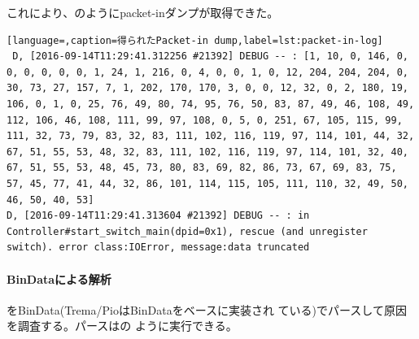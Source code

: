 これにより、のようにpacket-inダンプが取得できた。
\begin{lstlisting}[language=,caption=得られたPacket-in dump,label=lst:packet-in-log]
 D, [2016-09-14T11:29:41.312256 #21392] DEBUG -- : [1, 10, 0, 146, 0, 0, 0, 0, 0, 0, 1, 24, 1, 216, 0, 4, 0, 0, 1, 0, 12, 204, 204, 204, 0, 30, 73, 27, 157, 7, 1, 202, 170, 170, 3, 0, 0, 12, 32, 0, 2, 180, 19, 106, 0, 1, 0, 25, 76, 49, 80, 74, 95, 76, 50, 83, 87, 49, 46, 108, 49, 112, 106, 46, 108, 111, 99, 97, 108, 0, 5, 0, 251, 67, 105, 115, 99, 111, 32, 73, 79, 83, 32, 83, 111, 102, 116, 119, 97, 114, 101, 44, 32, 67, 51, 55, 53, 48, 32, 83, 111, 102, 116, 119, 97, 114, 101, 32, 40, 67, 51, 55, 53, 48, 45, 73, 80, 83, 69, 82, 86, 73, 67, 69, 83, 75, 57, 45, 77, 41, 44, 32, 86, 101, 114, 115, 105, 111, 110, 32, 49, 50, 46, 50, 40, 53]
D, [2016-09-14T11:29:41.313604 #21392] DEBUG -- : in Controller#start_switch_main(dpid=0x1), rescue (and unregister switch). error class:IOError, message:data truncated
\end{lstlisting}

    \paragraph{BinDataによる解析}
をBinData(Trema/PioはBinDataをベースに実装され
ている)でパースして原因を調査する。パースはの
ように実行できる。

